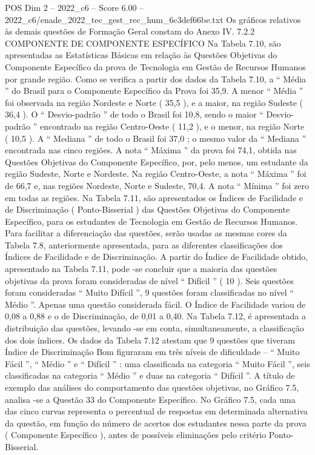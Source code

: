 \begin{textsample}{POS Dim 2 – 2022\_c6 – Score 6.00 – 2022\_c6/enade\_2022\_tec\_gest\_rec\_hum\_6c3def66be.txt}
Os gráficos relativos às demais questões de Formação Geral constam do Anexo IV. 7.2.2 COMPONENTE DE COMPONENTE ESPECÍFICO Na Tabela 7.10, são apresentadas as Estatísticas Básicas em relação às Questões Objetivas do Componente Específico da prova de Tecnologia em Gestão de Recursos Humanos por grande região.
Como se verifica a partir dos dados da Tabela 7.10, a “ Média ” do Brasil para o Componente Específico da Prova foi 35,9.
A menor “ Média ” foi observada na região Nordeste e Norte ( 35,5 ), e a maior, na região Sudeste ( 36,4 ).
O “ Desvio-padrão ” de todo o Brasil foi 10,8, sendo o maior “ Desvio-padrão ” encontrado na região Centro-Oeste ( 11,2 ), e o menor, na região Norte ( 10,5 ).
A “ Mediana ” de todo o Brasil foi 37,0 ; o mesmo valor da “ Mediana ” encontrada nas cinco regiões.
A nota “ Máxima ” da prova foi 74,1, obtida nas Questões Objetivas do Componente Específico, por, pelo menos, um estudante da região Sudeste, Norte e Nordeste.
Na região Centro-Oeste, a nota “ Máxima ” foi de 66,7 e, nas regiões Nordeste, Norte e Sudeste, 70,4.
A nota “ Mínima ” foi zero em todas as regiões.
Na Tabela 7.11, são apresentados os Índices de Facilidade e de Discriminação ( Ponto-Bisserial ) das Questões Objetivas do Componente Específico, para os estudantes de Tecnologia em Gestão de Recursos Humanos.
Para facilitar a diferenciação das questões, serão usadas as mesmas cores da Tabela 7.8, anteriormente apresentada, para as diferentes classificações dos Índices de Facilidade e de Discriminação.
A partir do Índice de Facilidade obtido, apresentado na Tabela 7.11, pode -se concluir que a maioria das questões objetivas da prova foram consideradas de nível “ Difícil ” ( 10 ).
Seis questões foram consideradas “ Muito Difícil ”, 9 questões foram classificadas no nível “ Médio ”.
Apenas uma questão considerada fácil.
O Índice de Facilidade variou de 0,08 a 0,88 e o de Discriminação, de 0,01 a 0,40.
Na Tabela 7.12, é apresentada a distribuição das questões, levando -se em conta, simultaneamente, a classificação dos dois índices.
Os dados da Tabela 7.12 atestam que 9 questões que tiveram Índice de Discriminação Bom figuraram em três níveis de dificuldade – “ Muito Fácil ”, “ Médio ” e “ Difícil ” : uma classificada na categoria “ Muito Fácil ”, seis classificadas na categoria “ Médio ” e duas na categoria “ Difícil ”.
A título de exemplo das análises do comportamento das questões objetivas, no Gráfico 7.5, analisa -se a Questão 33 do Componente Específico.
No Gráfico 7.5, cada uma das cinco curvas representa o percentual de respostas em determinada alternativa da questão, em função do número de acertos dos estudantes nessa parte da prova ( Componente Específico ), antes de possíveis eliminações pelo critério Ponto-Bisserial.

\end{textsample}
